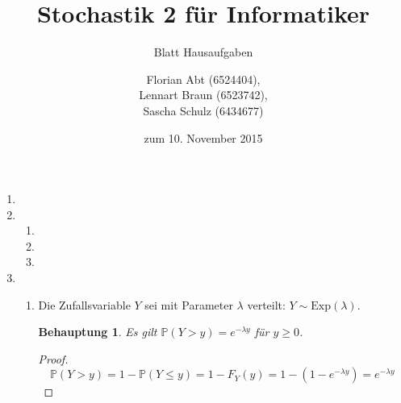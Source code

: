 \documentclass[a4paper]{scrartcl}
\title{Stochastik 2 für Informatiker}
\subtitle{Blatt {\blattnr} Hausaufgaben}
\author{
    Florian Abt (6524404), \\
    Lennart Braun (6523742), \\
    Sascha Schulz (6434677)
}
\date{zum 10. November 2015}
\newtheorem*{behaupt}{Behauptung}
\newcommand{\prob}{\mathbb{P}}
\def \blattnr {4}
\begin{document}
\maketitle

\begin{enumerate}[label=\bfseries \blattnr.\arabic*]
    \item

    \item
        \begin{enumerate}
            \item

            \item

            \item

        \end{enumerate}

    \item 
        \begin{enumerate}
            \item
                Die Zufallsvariable $Y$ sei mit Parameter $\lambda$ verteilt:
                $Y \sim \text{Exp}(\lambda)$.
                \begin{behaupt}
                    Es gilt $\prob(Y > y) = e^{-\lambda y}$ für $y \geq 0$.
                \end{behaupt}
                \begin{proof}
                    \begin{equation*}
                        \prob(Y > y)
                        = 1 - \prob(Y \leq y)
                        = 1 - F_Y(y)
                        = 1 - (1 - e^{-\lambda y})
                        = e^{-\lambda y}
                    \end{equation*}
                \end{proof}


\end{enumerate}
\end{enumerate}
\end{document}
